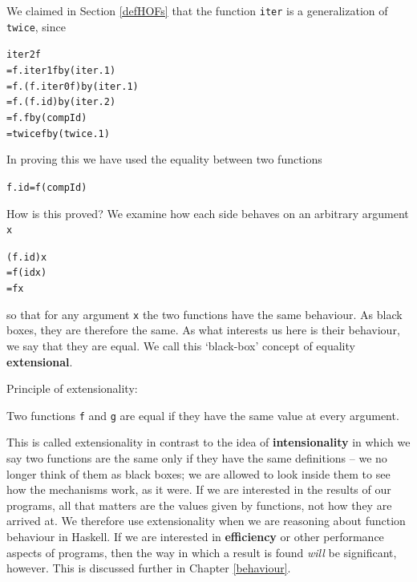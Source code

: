 We claimed in Section \ref{defHOFs} that the function \texttt{iter} is
a generalization of \texttt{twice}, since
\begin{alltt}
iter 2 f
  = f . iter 1 f\hfill {\rm by} (iter.1)
  = f . (f . iter 0 f)\hfill {\rm by} (iter.1)
  = f . (f . id)\hfill {\rm by} (iter.2)
  = f . f\hfill {\rm by} (compId)
  = twice f\hfill {\rm by} (twice.1)
\end{alltt}
In proving this we have used the equality between two functions
\begin{alltt}
f . id = f \hfill \texttt{(compId)}
\end{alltt}
How is this proved? We examine how each side behaves on an arbitrary argument
\texttt{x}
\begin{alltt}
(f . id) x
  = f (id x)
  = f x
\end{alltt}
so that for any argument \texttt{x} the two functions have the same
behaviour. As black boxes, they are therefore the same. 
As what interests us here is their behaviour,
we say that they are equal. We call this `black-box' concept of equality 
\textbf{extensional}.

\begin{definition}{{\sffamily Principle of extensionality:}
\medskip

\noindent
Two functions \texttt{f} and \texttt{g} are equal if they have the same value at
every argument.}
\end{definition}

\noindent
This is called extensionality in contrast to the idea of 
\textbf{intensionality} in which we say two functions are the same only if they have
the same definitions -- we no longer think of them as black boxes; we
are allowed to look inside them to see how the mechanisms work, as it were. If
we are interested in the results of our programs, all that matters are the
values given by functions, not how they are arrived at. We therefore use
extensionality when we are reasoning about function behaviour in Haskell. If
we are interested in \textbf{efficiency} or other performance aspects of
programs, then the way in which a result is found {\em will\/} be significant,
however. This is discussed further in Chapter \ref{behaviour}.

